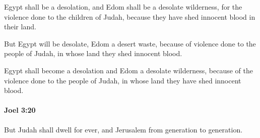 			\begin{versebox}
					\item[BHS] 
					\item[LXX] 
					\item[ASV] Egypt shall be a desolation, and Edom shall be a desolate wilderness, for the violence done to the children of Judah, because they have shed innocent blood in their land.
					\item[NIV] But Egypt will be desolate, Edom a desert waste, because of violence done to the people of Judah, in whose land they shed innocent blood.
					\item[NRSV] Egypt shall become a desolation and Edom a desolate wilderness, because of the violence done to the people of Judah, in whose land they have shed innocent blood.
			\end{versebox}

		\paragraph{Joel 3:20} %
			\label{JOEL-3-20}

			But Judah shall dwell for ever, and Jerusalem from generation to generation.

